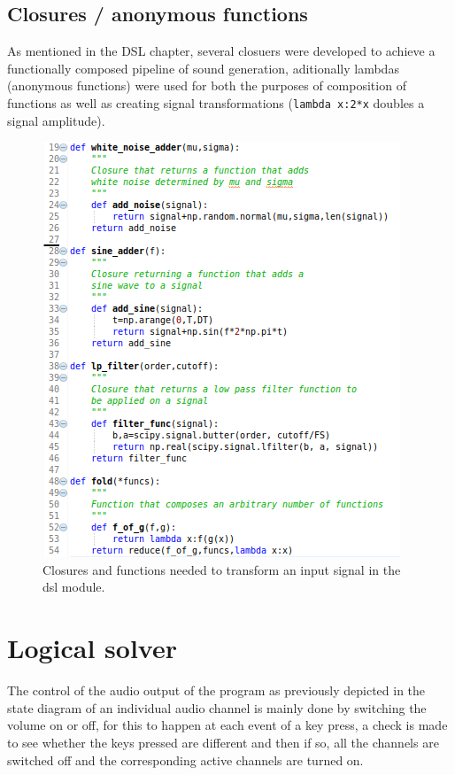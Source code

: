 \documentclass[margin,line,a4paper,authoryear,12pt]{report}
\begin{document}
\section{Closures / anonymous functions}
As mentioned in the DSL chapter, several closuers were developed to achieve a functionally composed pipeline
of sound generation, aditionally lambdas (anonymous functions) were used for both the purposes of composition
of functions as well as creating signal transformations (\texttt{lambda x:2*x} doubles a signal amplitude).
\begin{figure}[h!]
    \centering
    \includegraphics[width=0.7\linewidth]{dsl_closures.png}
    \caption{ Closures and functions needed to transform an input signal in the dsl module.}
    \label{fig:dsl_class}
\end{figure}


\chapter{Logical solver}
The control of the audio output of the program as previously depicted in the state diagram of an individual audio channel is
mainly done by switching the volume on or off, for this to happen at each event of a key press, a check is made to see whether the
keys pressed are different and then if so, all the channels are switched off and the corresponding active channels are turned on. 
\end{document}
